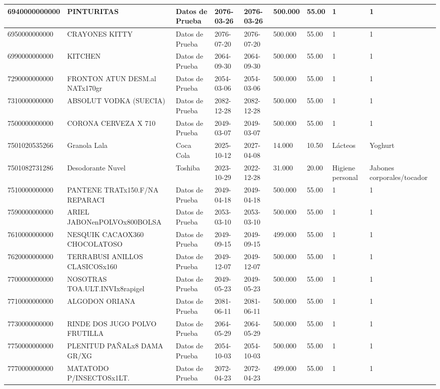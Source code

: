 \documentclass[a4paper,12pt]{article}
\begin{document}
\begin{landscape}
\begin{longtable}{|p{4cm}|p{2.5cm}|p{2.5cm}|p{1.8cm}|p{1.8cm}|p{1cm}|p{1cm}|p{3cm}|p{3cm}||}
6940000000000 & PINTURITAS & Datos de Prueba & 2076-03-26 & 2076-03-26 & 500.000 & 55.00 & 1 & 1 \\ \hline 
6950000000000 & CRAYONES KITTY & Datos de Prueba & 2076-07-20 & 2076-07-20 & 500.000 & 55.00 & 1 & 1 \\ \hline 
6990000000000 & KITCHEN & Datos de Prueba & 2064-09-30 & 2064-09-30 & 500.000 & 55.00 & 1 & 1 \\ \hline 
7290000000000 & FRONTON ATUN DESM.al NATx170gr & Datos de Prueba & 2054-03-06 & 2054-03-06 & 500.000 & 55.00 & 1 & 1 \\ \hline 
7310000000000 & ABSOLUT VODKA (SUECIA) & Datos de Prueba & 2082-12-28 & 2082-12-28 & 500.000 & 55.00 & 1 & 1 \\ \hline 
7500000000000 & CORONA CERVEZA X 710 & Datos de Prueba & 2049-03-07 & 2049-03-07 & 500.000 & 55.00 & 1 & 1 \\ \hline 
7501020535266 & Granola Lala & Coca Cola & 2025-10-12 & 2027-04-08 & 14.000 & 10.50 & Lácteos & Yoghurt \\ \hline 
7501082731286 & Desodorante Nuvel & Toshiba & 2023-10-29 & 2022-12-28 & 31.000 & 20.00 & Higiene personal & Jabones corporales/tocador \\ \hline 
7510000000000 & PANTENE TRATx150.F/NA REPARACI & Datos de Prueba & 2049-04-18 & 2049-04-18 & 500.000 & 55.00 & 1 & 1 \\ \hline 
7590000000000 & ARIEL JABONenPOLVOx800BOLSA & Datos de Prueba & 2053-03-10 & 2053-03-10 & 500.000 & 55.00 & 1 & 1 \\ \hline 
7610000000000 & NESQUIK CACAOX360 CHOCOLATOSO & Datos de Prueba & 2049-09-15 & 2049-09-15 & 499.000 & 55.00 & 1 & 1 \\ \hline 
7620000000000 & TERRABUSI ANILLOS CLASICOSx160 & Datos de Prueba & 2049-12-07 & 2049-12-07 & 500.000 & 55.00 & 1 & 1 \\ \hline 
7700000000000 & NOSOTRAS TOA.ULT.INVIx8rapigel & Datos de Prueba & 2049-05-23 & 2049-05-23 & 500.000 & 55.00 & 1 & 1 \\ \hline 
7710000000000 & ALGODON ORIANA & Datos de Prueba & 2081-06-11 & 2081-06-11 & 500.000 & 55.00 & 1 & 1 \\ \hline 
7730000000000 & RINDE DOS JUGO POLVO FRUTILLA & Datos de Prueba & 2064-05-29 & 2064-05-29 & 500.000 & 55.00 & 1 & 1 \\ \hline 
7750000000000 & PLENITUD PAÑALx8 DAMA GR/XG & Datos de Prueba & 2054-10-03 & 2054-10-03 & 500.000 & 55.00 & 1 & 1 \\ \hline 
7770000000000 & MATATODO P/INSECTOSx1LT. & Datos de Prueba & 2072-04-23 & 2072-04-23 & 499.000 & 55.00 & 1 & 1 \\ \hline 

\end{longtable}
\end{landscape}
\end{document}
